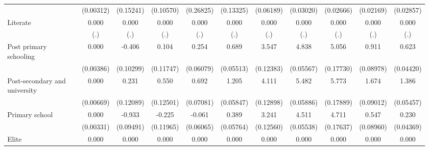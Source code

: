 {\begin{tabular}{l*{10}{c}}
                    &   (0.00312)         &   (0.15241)         &   (0.10570)         &   (0.26825)         &   (0.13325)         &   (0.06189)         &   (0.03020)         &   (0.02666)         &   (0.02169)         &   (0.02857)         \\
Literate            &       0.000         &       0.000         &       0.000         &       0.000         &       0.000         &       0.000         &       0.000         &       0.000         &       0.000         &       0.000         \\
                    &         (.)         &         (.)         &         (.)         &         (.)         &         (.)         &         (.)         &         (.)         &         (.)         &         (.)         &         (.)         \\
Post primary schooling&       0.000         &      -0.406\sym{***}&       0.104         &       0.254\sym{***}&       0.689\sym{***}&       3.547\sym{***}&       4.838\sym{***}&       5.056\sym{***}&       0.911\sym{***}&       0.623\sym{***}\\
                    &   (0.00386)         &   (0.10299)         &   (0.11747)         &   (0.06079)         &   (0.05513)         &   (0.12383)         &   (0.05567)         &   (0.17730)         &   (0.08978)         &   (0.04420)         \\
Post-secondary and university&       0.000         &       0.231         &       0.550\sym{***}&       0.692\sym{***}&       1.205\sym{***}&       4.111\sym{***}&       5.482\sym{***}&       5.773\sym{***}&       1.674\sym{***}&       1.386\sym{***}\\
                    &   (0.00669)         &   (0.12089)         &   (0.12501)         &   (0.07081)         &   (0.05847)         &   (0.12898)         &   (0.05886)         &   (0.17889)         &   (0.09012)         &   (0.05457)         \\
Primary school      &       0.000         &      -0.933\sym{***}&      -0.225         &      -0.061         &       0.389\sym{***}&       3.241\sym{***}&       4.511\sym{***}&       4.711\sym{***}&       0.547\sym{***}&       0.230\sym{***}\\
                    &   (0.00331)         &   (0.09491)         &   (0.11965)         &   (0.06065)         &   (0.05764)         &   (0.12560)         &   (0.05538)         &   (0.17637)         &   (0.08960)         &   (0.04369)         \\
Elite               &       0.000         &       0.000         &       0.000         &       0.000         &       0.000         &       0.000         &       0.000         &       0.000         &       0.000         &       0.000         \\

\end{tabular}}

